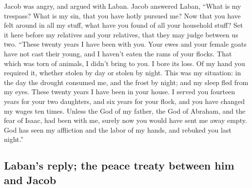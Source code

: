  Jacob was angry, and argued with Laban. Jacob answered
Laban, ``What is my trespass? What is my sin, that you have hotly
pursued me?  Now that you have felt around in all my
stuff, what have you found of all your household stuff? Set it here
before my relatives and your relatives, that they may judge between us
two.  ``These twenty years I have been with you. Your
ewes and your female goats have not cast their young, and I haven't
eaten the rams of your flocks.  That which was torn of
animals, I didn't bring to you. I bore its loss. Of my hand you required
it, whether stolen by day or stolen by night.  This was
my situation: in the day the drought consumed me, and the frost by
night; and my sleep fled from my eyes.  These twenty
years I have been in your house. I served you fourteen years for your
two daughters, and six years for your flock, and you have changed my
wages ten times.  Unless the God of my father, the God of
Abraham, and the fear of Isaac, had been with me, surely now you would
have sent me away empty. God has seen my affliction and the labor of my
hands, and rebuked you last night.''

\hypertarget{labans-reply-the-peace-treaty-between-him-and-jacob}{%
\subsection{Laban's reply; the peace treaty between him and
Jacob}\label{labans-reply-the-peace-treaty-between-him-and-jacob}}

